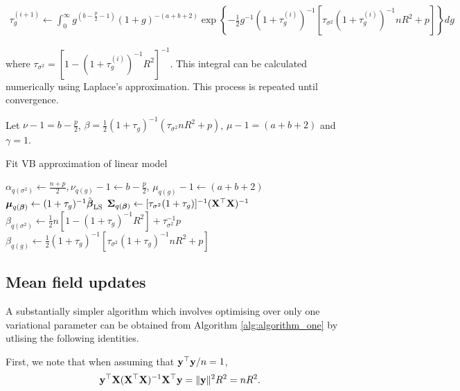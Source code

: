 \documentclass{amsart}[12pt]
\begin{document}
\begin{align*}
	\tau_g^{(i+1)} \leftarrow \int_0^\infty g^{\left(b - \frac{p}{2} - 1\right)}                                   
	(1 + g)^{- (a + b + 2)}                                                                                        
	\exp \left \{- \frac{1}{2} g^{-1}  (1 + \tau_g^{(i)})^{-1} [\tau_{\sigma^2} (1 + \tau_g^{(i)})^{-1} n R^2 + p] 
	\right \} dg                                                                                                   
\end{align*}

\noindent where $\tau_{\sigma^2} = [1 - (1 + \tau_g^{(i)})^{-1} R^2]^{-1}$. This integral can be calculated
numerically using Laplace's approximation. This process is repeated until convergence.

Let $\nu - 1 = b - \frac{p}{2}$, 
$\beta = \frac{1}{2} (1 + \tau_g)^{-1} (\tau_{\sigma^2} n R^2 + p)$, 
$\mu - 1 = (a + b + 2)$ and $\gamma = 1$. 

\begin{algorithm}
	\caption{Fit VB approximation of linear model}
	\label{alg:algorithm_one}
	\begin{algorithmic}
		\REQUIRE $\alpha_{q(\sigma^2)} \leftarrow \frac{n + p}{2}, \nu_{q(g)} - 1 \leftarrow b - \frac{p}{2}$, $\mu_{q(g)} - 1 \leftarrow (a + b + 2)$
		\STATE ${\boldsymbol \mu}_{q({\boldsymbol \beta})} \leftarrow (1 + \tau_g)^{-1} \hat{{\boldsymbol \beta}}_{\text{LS}}$
		\STATE ${\boldsymbol \Sigma}_{q({\boldsymbol \beta})} \leftarrow [\tau_{\sigma^2} (1 + \tau_g)]^{-1} ({\bf X}^\top {\bf X})^{-1}$
		\STATE $\beta_{q(\sigma^2)} \leftarrow  \frac{1}{2} {n[1 - (1 + \tau_g)^{-1} R^2] + \tau_{\sigma^2}^{-1} p}$
		\STATE $\beta_{q(g)} \leftarrow \frac{1}{2} (1 + \tau_g)^{-1} [\tau_{\sigma^2} (1 + \tau_g)^{-1} n R^2 + p]$
		\ENDWHILE
	\end{algorithmic}
\end{algorithm}

\subsection{Mean field updates}
\label{sec:mean_field_updates}

A substantially simpler algorithm  which involves optimising over only one variational parameter can be
obtained from Algorithm \ref{alg:algorithm_one} by utlising the following identities.

First, we note that when assuming that ${\bf y}^\top {\bf y} / n = 1$,
\[{\bf y}^\top {\bf X} ({\bf X}^\top {\bf X})^{-1} {\bf X}^\top {\bf y} =\|{\bf y}\|^2 R^2 = n R^2.\]
\end{document}
